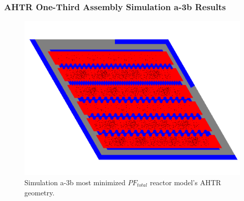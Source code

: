 
\begin{frame}
    \frametitle{AHTR One-Third Assembly Simulation a-3b Results}
    \begin{figure}
        \includegraphics[width=0.7\linewidth]{../docs/figures/assem-obj-3-all-min-pf.png} 
        \caption{Simulation a-3b most minimized $PF_{total}$ reactor model's AHTR geometry.}
    \end{figure}
\end{frame}

